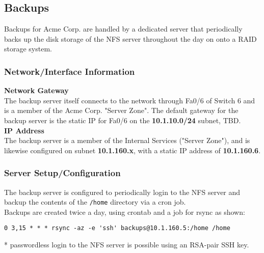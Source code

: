 \subsection{Backups}
Backups for Acme Corp. are handled by a dedicated server that periodically 
backs up the disk storage of the NFS server throughout the day on onto a RAID 
storage system.

\subsubsection{Network/Interface Information}
\textbf{Network Gateway} \\
The backup server itself connects to the network through Fa0/6 of Switch 6 and 
is a member of the Acme Corp. "Server Zone". The default gateway for the backup 
server is the static IP for Fa0/6 on the \textbf{10.1.10.0/24} subnet, TBD. \\

\noindent
\textbf{IP Address} \\
The backup server is a member of the Internal Services ("Server Zone"), and is
likewise configured on subnet \textbf{10.1.160.x}, with a static IP address of 
\textbf{10.1.160.6}. \\

\subsubsection{Server Setup/Configuration}
The backup server is configured to periodically login to the NFS server and
backup the contents of the \lstinline$/home$ directory via a cron job. \\

\noindent
Backups are created twice a day, using crontab and a job for rsync as shown: \\

\begin{lstlisting}[backgroundcolor=\color{Gray}]
 0 3,15 * * * rsync -az -e 'ssh' backups@10.1.160.5:/home /home
\end{lstlisting}
\vspace{1em}
* passwordless login to the NFS server is possible using an RSA-pair SSH key.
